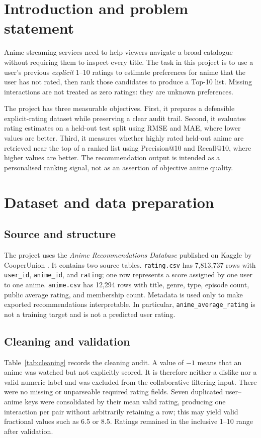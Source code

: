 \documentclass[12pt,a4paper]{article}
\begin{document}
\section{Introduction and problem statement}
Anime streaming services need to help viewers navigate a broad catalogue without requiring them to inspect every title. The task in this project is to use a user's previous \emph{explicit} 1--10 ratings to estimate preferences for anime that the user has not rated, then rank those candidates to produce a Top-10 list. Missing interactions are not treated as zero ratings: they are unknown preferences.

The project has three measurable objectives. First, it prepares a defensible explicit-rating dataset while preserving a clear audit trail. Second, it evaluates rating estimates on a held-out test split using RMSE and MAE, where lower values are better. Third, it measures whether highly rated held-out anime are retrieved near the top of a ranked list using Precision@10 and Recall@10, where higher values are better. The recommendation output is intended as a personalised ranking signal, not as an assertion of objective anime quality.

\section{Dataset and data preparation}
\subsection{Source and structure}
The project uses the \emph{Anime Recommendations Database} published on Kaggle by CooperUnion \parencite{cooperunion2016}. It contains two source tables. \texttt{rating.csv} has 7,813,737 rows with \texttt{user\_id}, \texttt{anime\_id}, and \texttt{rating}; one row represents a score assigned by one user to one anime. \texttt{anime.csv} has 12,294 rows with title, genre, type, episode count, public average rating, and membership count. Metadata is used only to make exported recommendations interpretable. In particular, \texttt{anime\_average\_rating} is not a training target and is not a predicted user rating.

\subsection{Cleaning and validation}
Table~\ref{tab:cleaning} records the cleaning audit. A value of $-1$ means that an anime was watched but not explicitly scored. It is therefore neither a dislike nor a valid numeric label and was excluded from the collaborative-filtering input. There were no missing or unparseable required rating fields. Seven duplicated user--anime keys were consolidated by their mean valid rating, producing one interaction per pair without arbitrarily retaining a row; this may yield valid fractional values such as 6.5 or 8.5. Ratings remained in the inclusive 1--10 range after validation.
\end{document}

